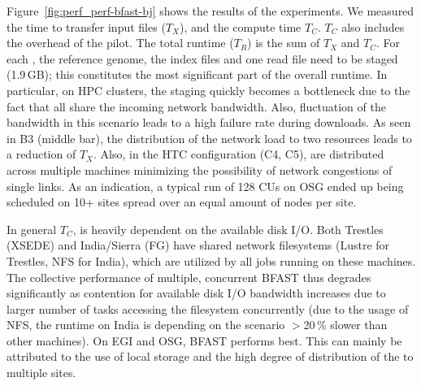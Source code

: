 \documentclass[conference]{IEEEtran}
\begin{document}
Figure~\ref{fig:perf_perf-bfast-bj} shows the results of the
experiments. We measured the time to transfer input files ($T_X$), and
the compute time $T_C$. $T_C$ also includes the overhead of the pilot.
The total runtime ($T_R$) is the sum of $T_X$ and $T_C$.  For each
\cu, the reference genome, the index files and one read file need to
be staged (1.9\,GB); this constitutes the most significant part of the
overall runtime. In particular, on HPC clusters, the staging quickly
becomes a bottleneck due to the fact that all \cus share the incoming
network bandwidth.  Also, fluctuation of the bandwidth in this
scenario leads to a high failure rate during downloads. As seen in B3
(middle bar), the distribution of the network load to two resources
leads to a reduction of $T_{X}$. Also, in the HTC configuration (C4,
C5), \cus are distributed across multiple machines minimizing the
possibility of network congestions of single links. As an indication,
a typical run of 128 CUs on OSG ended up being scheduled on 10+ sites
spread over an equal amount of nodes per site.



In general $T_{C}$, %
is heavily dependent on the available disk I/O. Both Trestles (XSEDE)
and India/Sierra (FG) have shared network filesystems (Lustre for
Trestles, NFS for India), which are utilized by all jobs running on
these machines. The collective performance of multiple, concurrent
BFAST \cu thus degrades significantly as contention for available disk
I/O bandwidth increases due to larger number of tasks accessing the
filesystem concurrently (due to the usage of NFS, the runtime on India
is depending on the scenario $>$20\,\% slower than other machines). On
EGI and OSG, BFAST \cu performs best. This can mainly be attributed to
the use of local storage and the high degree of distribution of the
\cus to multiple sites.


 
\end{document}
